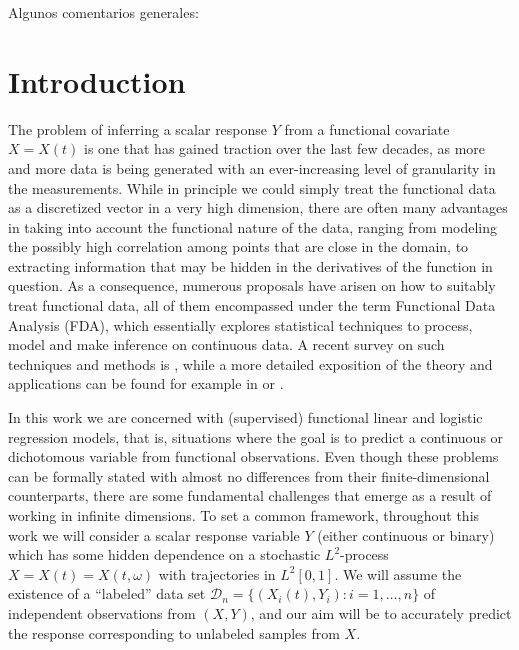 \documentclass[ba]{imsart}
\numberwithin{equation}{section}
\theoremstyle{plain}
\newenvironment{comment}
{
\noindent \em \color{red}
}
{
\color{black}
}
\begin{document}
\begin{comment}
  Algunos comentarios generales:
\end{comment}

\section{Introduction}\label{sec:intro}

The problem of inferring a scalar response \(Y\) from a functional covariate \(X=X(t)\) is one that has gained traction over the last few decades, as more and more data is being generated with an ever-increasing level of granularity in the measurements. While in principle we could simply treat the functional data as a discretized vector in a very high dimension, there are often many advantages in taking into account the functional nature of the data, ranging from modeling the possibly high correlation among points that are close in the domain, to extracting information that may be hidden in the derivatives of the function in question. As a consequence, numerous proposals have arisen on how to suitably treat functional data, all of them encompassed under the term Functional Data Analysis (FDA), which essentially explores statistical techniques to process, model and make inference on continuous data. A recent survey on such techniques and methods is \citet{cuevas2014partial}, while a more detailed exposition of the theory and applications can be found for example in \citet{hsing2015theoretical} or \citet{berrendero2019rkhs}.

In this work we are concerned with (supervised) functional linear and logistic regression models, that is, situations where the goal is to predict a continuous or dichotomous variable from functional observations. Even though these problems can be formally stated with almost no differences from their finite-dimensional counterparts, there are some fundamental challenges that emerge as a result of working in infinite dimensions. To set a common framework, throughout this work we will consider a scalar response variable \(Y\) (either continuous or binary) which has some hidden dependence on a stochastic \(L^2\)-process \(X=X(t)=X(t, \omega)\) with trajectories in \(L^2[0, 1]\). We will assume the existence of a ``labeled'' data set \(\mathcal D_n =\{(X_i(t), Y_i): i=1,\dots, n\}\) of independent observations from \((X, Y)\), and our aim will be to accurately predict the response corresponding to unlabeled samples from \(X\).
\end{document}
